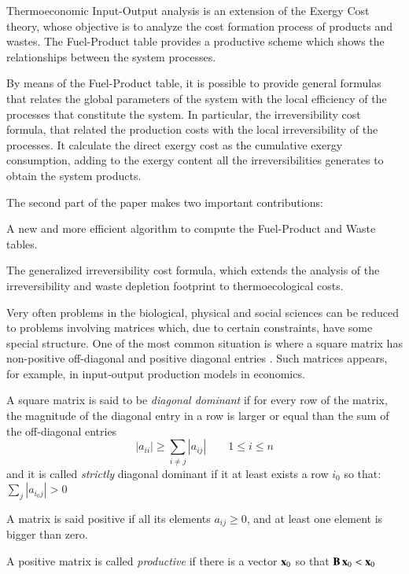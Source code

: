 \documentclass{ecos2018}
\begin{document}
Thermoeconomic Input-Output analysis is an extension of the Exergy Cost theory, whose objective is to analyze the cost formation process of products and wastes. The Fuel-Product table provides a productive scheme which shows the relationships between the system processes.

By means of the Fuel-Product table, it is possible to provide general formulas that relates the global parameters of the system with the local efficiency of the processes that constitute the system. In particular, the irreversibility cost formula, that related the production costs with the local irreversibility of the processes. It calculate the direct exergy cost as the cumulative exergy consumption, adding to the exergy content all the irreversibilities generates to obtain the system products. 

The second part of the paper makes two important contributions:
\begin{elist}
	\item A new and more efficient algorithm to compute the Fuel-Product and Waste tables.
	\item The generalized irreversibility cost formula, which extends the analysis of the irreversibility and waste depletion footprint to thermoecological costs.   
\end{elist}

\apendice
Very often problems in the biological, physical and social sciences can be reduced to problems involving matrices which, due to certain constraints, have some special structure. One of the most common situation is where a square matrix has non-positive off-diagonal and positive diagonal entries \cite{Plemmons74}. Such matrices appears, for example, in input-output production models in economics.

A square matrix  is said to be \emph{diagonal dominant} if for every row of the matrix, the magnitude of the diagonal entry in a row is larger or equal than the sum of the off-diagonal entries
\[ \left|a_{ii}\right| \geq \sum_{i \neq j} {\left|a_{ij}\right|}
\qquad 1 \leq i \leq n \]
and it is called \emph{strictly} diagonal dominant if it at least exists a row $i_0$
so that: $\sum_{j}{\left| a_{i_0 j} \right|} > 0$

A matrix  is said positive if all its elements $a_{ij}\ge0$, and at least one element is bigger than zero.

A positive matrix  is called \emph{productive} \cite{Gale89} if there is a vector $\mathbf{x}_0$ so that
$\mathbf{B}\,\mathbf{x}_0 < \mathbf{x}_0$
\end{document}
